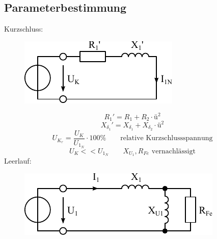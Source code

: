 \subsection{Parameterbestimmung}
Kurzschluss: 
\begin{figure}[h!]
\centering
\includegraphics[scale=\schscale]{trafo-param-short.pdf}
\label{sch:trafo-param-short}
\end{figure}
\[ R_1' = R_1 + R_2 \cdot ü^2 \]
\[ X_{\delta_1}' = X_{\delta_1} + X_{\delta_2} \cdot ü^2 \]
\[ U_{K_r} = \frac{U_K}{U_{1_N}} \cdot 100 \% 
\qquad \text{relative Kurzschlussspannung} \]
\[ U_K << U_{1_N} \qquad X_{U_1}, R_{Fe} \text{ vernachlässigt} \]
Leerlauf: 
\begin{figure}[h!]
\centering
\includegraphics[scale=\schscale]{trafo-param-open.pdf}
\label{sch:trafo-param-open}
\end{figure}
